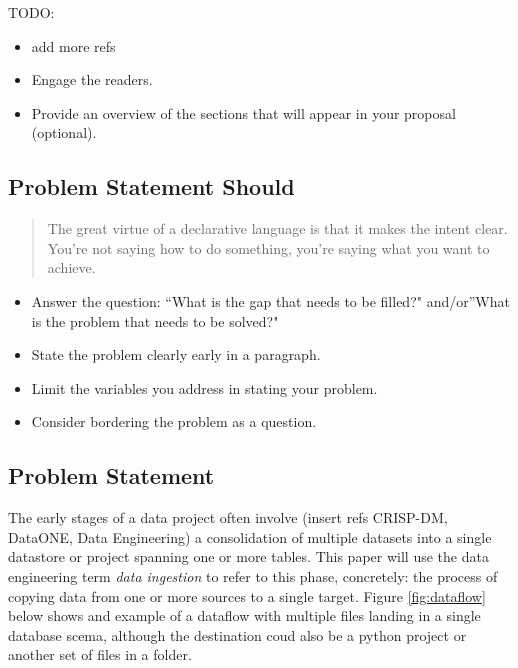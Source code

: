 TODO:

\begin{itemize}
\tightlist
\item
  add more refs
\item
  Engage the readers.
\item
  Provide an overview of the sections that will appear in your proposal
  (optional).
\end{itemize}

\subsection{Problem Statement Should}\label{problem-statement-should}

\begin{quote}
The great virtue of a declarative language is that it makes the intent
clear. You're not saying how to do something, you're saying what you
want to achieve. \citep[p.~39]{patterns_eaa}
\end{quote}

\begin{itemize}
\item
  Answer the question: ``What is the gap that needs to be filled?"
  and/or''What is the problem that needs to be solved?"
\item
  State the problem clearly early in a paragraph.
\item
  Limit the variables you address in stating your problem.
\item
  Consider bordering the problem as a question.
\end{itemize}

\subsection{Problem Statement}\label{problem-statement}

The early stages of a data project often involve (insert refs CRISP-DM,
DataONE, Data Engineering) a consolidation of multiple datasets into a
single datastore or project spanning one or more tables. This paper will
use the data engineering term \emph{data ingestion} to refer to this
phase, concretely: the process of copying data from one or more sources
to a single target. Figure \ref{fig:dataflow} below shows and example of
a dataflow with multiple files landing in a single database scema,
although the destination coud also be a python project or another set of
files in a folder.



